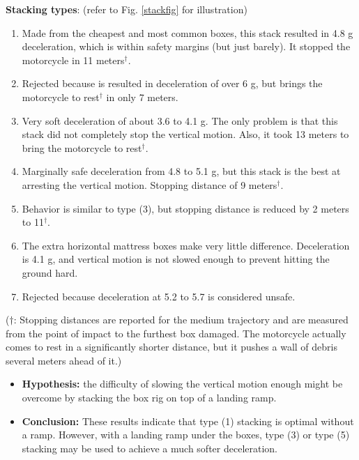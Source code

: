 \documentclass[12pt,a4paper,titlepage]{article}
\begin{document}
{\bf Stacking types}:
(refer to Fig. \ref{stackfig} for illustration)
\begin{enumerate}

\item Made from the cheapest and most common boxes, this stack resulted in 4.8 g deceleration,
which is within safety margins (but just barely).  It stopped the motorcycle in 11 meters$^\dagger$.

\item Rejected because is resulted in deceleration of over 6 g, but brings the motorcycle
to rest$^\dagger$ in only 7 meters.

\item Very soft deceleration of about 3.6 to 4.1 g.  The only problem is that this stack did not completely stop
 the vertical motion.  Also, it took 13 meters to bring the motorcycle to rest$^\dagger$.

\item Marginally safe deceleration from 4.8 to 5.1 g, but this stack is the best at arresting the
vertical motion.  Stopping distance of 9 meters$^\dagger$.

\item Behavior is similar to type (3), but stopping distance is reduced by 2 meters to 11$^\dagger$.

\item The extra horizontal mattress boxes make very little difference.  Deceleration is 4.1 g, and
vertical motion is not slowed enough to prevent hitting the ground hard.

\item Rejected because deceleration at 5.2 to 5.7 is considered unsafe.

\end{enumerate}
($\dagger$: Stopping distances are reported for the medium trajectory and are measured from the point of impact to the furthest box damaged.  The motorcycle actually comes to rest in a significantly shorter distance, but it pushes a wall of debris several meters ahead of it.)

\begin{itemize}
\item {\bf Hypothesis:} the difficulty of slowing the vertical motion enough might be overcome by stacking
the box rig on top of a landing ramp.
\item {\bf Conclusion:} These results indicate that type (1) stacking is optimal without a ramp.  However,
with a landing ramp under the boxes, type (3) or type (5) stacking may be used to achieve a much softer deceleration.
\end{itemize}
\end{document}
